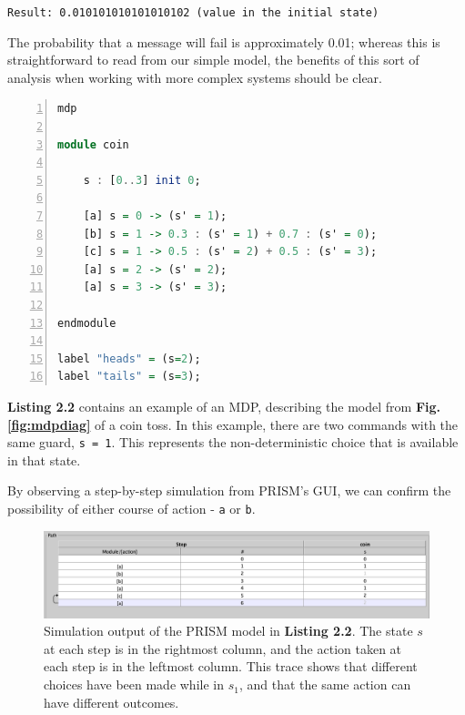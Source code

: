 \documentclass{l4proj}
\begin{document}
\begin{center}
    \texttt{Result: 0.010101010101010102 (value in the initial state)}
\end{center}

The probability that a message will fail is approximately 0.01; whereas this is straightforward to read from our simple model, the benefits of this sort of analysis when working with more complex systems should be clear.

\begin{lstlisting}[language=Haskell, numbers=left, caption=An MDP representation in the PRISM modelling language. This excerpt describes the simple coin toss model depicted in \textbf{Fig. \ref{fig:mdpdiag}}.] 
mdp

module coin

	s : [0..3] init 0;
	
	[a] s = 0 -> (s' = 1);
	[b] s = 1 -> 0.3 : (s' = 1) + 0.7 : (s' = 0);
	[c] s = 1 -> 0.5 : (s' = 2) + 0.5 : (s' = 3);
	[a] s = 2 -> (s' = 2);
	[a] s = 3 -> (s' = 3);

endmodule

label "heads" = (s=2);
label "tails" = (s=3);
\end{lstlisting}

\textbf{Listing 2.2} contains an example of an MDP, describing the model from \textbf{Fig. \ref{fig:mdpdiag}} of a coin toss. In this example, there are two commands with the same guard, \texttt{s = 1}. This represents the non-deterministic choice that is available in that state. 

By observing a step-by-step simulation from PRISM's GUI, we can confirm the possibility of either course of action - \texttt{a} or \texttt{b}.

\begin{figure}[h]
    \centering
    \includegraphics[scale=0.39]{images/simpath.png}   
    \caption{Simulation output of the PRISM model in \textbf{Listing 2.2}. The state $s$ at each step is in the rightmost column, and the action taken at each step is in the leftmost column. This trace shows that different choices have been made while in $s_1$, and that the same action can have different outcomes.}
    \label{fig:simpath} 
\end{figure}
\end{document}
